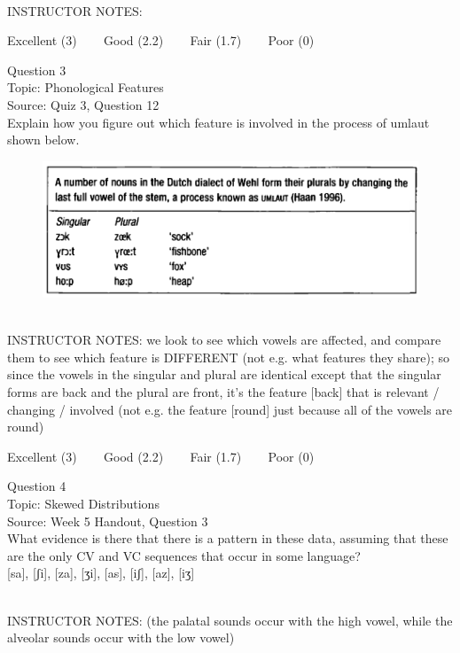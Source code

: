 \documentclass[12pt]{article}
\begin{document}
~\\
INSTRUCTOR NOTES: 


\vfill
Excellent (3) ~~~ Good (2.2) ~~~ Fair (1.7) ~~~ Poor (0)
\newpage

{\large Question 3}\\

Topic: Phonological Features\\
Source: Quiz 3, Question 12\\

Explain how you figure out which feature is involved in the process of umlaut shown below.\\

\begin{figure}[H]
\includegraphics{../images/dutch.png}
\end{figure}

~\\
INSTRUCTOR NOTES: we look to see which vowels are affected, and compare them to see which feature is DIFFERENT (not e.g. what features they share); so since the vowels in the singular and plural are identical except that the singular forms are back and the plural are front, it's the feature [back] that is relevant / changing / involved (not e.g. the feature [round] just because all of the vowels are round)


\vfill
Excellent (3) ~~~ Good (2.2) ~~~ Fair (1.7) ~~~ Poor (0)
\newpage

{\large Question 4}\\

Topic: Skewed Distributions\\
Source: Week 5 Handout, Question 3\\

What evidence is there that there is a pattern in these data, assuming that these are the only CV and VC sequences that occur in some language?\\

{[sa]}, {[ʃi]}, {[za]}, {[ʒi]}, {[as]}, {[iʃ]}, {[az]}, {[iʒ]}


~\\
INSTRUCTOR NOTES: (the palatal sounds occur with the high vowel, while the alveolar sounds occur with the low vowel)
\end{document}
